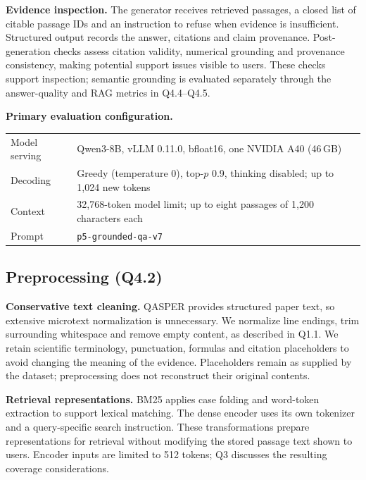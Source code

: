 \textbf{Evidence inspection.} The generator receives retrieved passages, a closed list of citable passage IDs and an instruction to refuse when evidence is insufficient. Structured output records the answer, citations and claim provenance. Post-generation checks assess citation validity, numerical grounding and provenance consistency, making potential support issues visible to users. These checks support inspection; semantic grounding is evaluated separately through the answer-quality and RAG metrics in Q4.4--Q4.5.

\noindent\begin{minipage}{\linewidth}
\textbf{Primary evaluation configuration.}
\begin{center}\small
\begin{tabularx}{\linewidth}{lY}\toprule
Model serving & Qwen3-8B, vLLM 0.11.0, bfloat16, one NVIDIA A40 (46\,GB)\\
Decoding & Greedy (temperature 0), top-$p$ 0.9, thinking disabled; up to 1,024 new tokens\\
Context & 32,768-token model limit; up to eight passages of 1,200 characters each\\
Prompt & \texttt{p5-grounded-qa-v7}\\\bottomrule
\end{tabularx}
\end{center}
\end{minipage}\par


% 

\subsection{Preprocessing (Q4.2)}
\textbf{Conservative text cleaning.} QASPER provides structured paper text, so extensive microtext normalization is unnecessary. We normalize line endings, trim surrounding whitespace and remove empty content, as described in Q1.1. We retain scientific terminology, punctuation, formulas and citation placeholders to avoid changing the meaning of the evidence. Placeholders remain as supplied by the dataset; preprocessing does not reconstruct their original contents.

\textbf{Retrieval representations.} BM25 applies case folding and word-token extraction to support lexical matching. The dense encoder uses its own tokenizer and a query-specific search instruction. These transformations prepare representations for retrieval without modifying the stored passage text shown to users. Encoder inputs are limited to 512 tokens; Q3 discusses the resulting coverage considerations.

